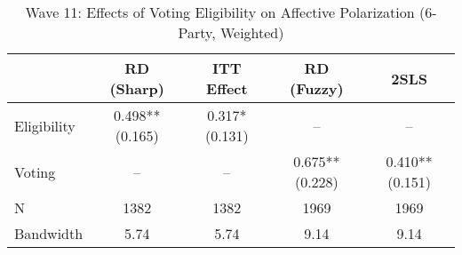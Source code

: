 \begin{table}[htbp]
\centering
\caption{Wave 11: Effects of Voting Eligibility on Affective Polarization (6-Party, Weighted)}
\label{tab:wave11_k6_w}
\begin{tabular}{lcccc}
\hline
 & RD (Sharp) & ITT Effect & RD (Fuzzy) & 2SLS \\
\hline
Eligibility & 0.498** (0.165) & 0.317* (0.131) & -- & -- \\
Voting & -- & -- & 0.675** (0.228) & 0.410** (0.151) \\
\hline
N & 1382 & 1382 & 1969 & 1969 \\
Bandwidth & 5.74 & 5.74 & 9.14 & 9.14 \\
\hline
\end{tabular}
\end{table}
